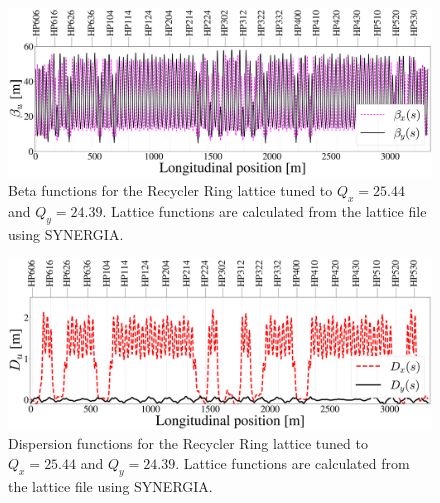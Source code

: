 \begin{figure}[H]
   \centering
   \includegraphics[width=\columnwidth]{chapter3/betas.png}
   \caption{Beta functions for the Recycler Ring lattice tuned to $Q_x=25.44$ and $Q_y=24.39$. Lattice functions are calculated from the lattice file using SYNERGIA.}
   \label{fig:rrbetas}
   \vspace{-1.25em}
\end{figure}

\begin{figure}[H]
   \centering
   \includegraphics[width=\columnwidth]{chapter3/disps.png}
   \caption{Dispersion functions for the Recycler Ring lattice tuned to $Q_x=25.44$ and $Q_y=24.39$. Lattice functions are calculated from the lattice file using SYNERGIA.}
   \label{fig:rrdisps}
   \vspace{-1.25em}
\end{figure}

